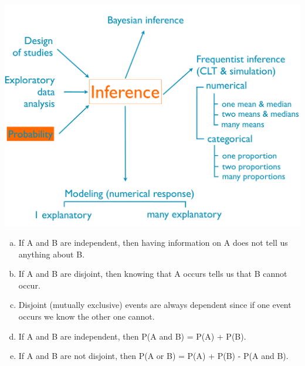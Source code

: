 \documentclass[11pt,containsverbatim,handout,xcolor=xelatex,dvipsnames,table]{beamer}
\newcommand{\solnMult}[1]{#1}
\begin{document}
\begin{frame}

{
{\scriptsize
{}}}
{
 \includegraphics[width=\textwidth]{figures/map/probability}
}

\vfill

{\footnotesize
\begin{enumerate}[(a)]
\item If A and B are independent, then having information on A does not tell us anything about B.
\item If A and B are disjoint, then knowing that A occurs tells us that B cannot occur.
\item Disjoint (mutually exclusive) events are always dependent since if one event occurs we know the other one cannot.
\item \solnMult{If A and B are independent, then P(A and B) = P(A) + P(B).}
\item If A and B are not disjoint, then P(A or B) = P(A) + P(B) - P(A and B).
\end{enumerate}
}

\end{frame}

\end{document}
